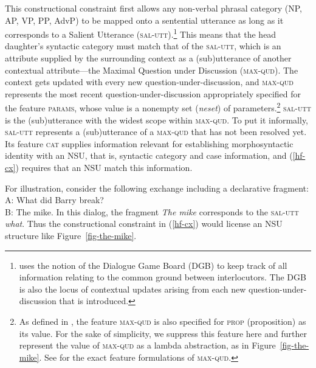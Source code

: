 \zs
%
%
This constructional constraint first allows 
any non-verbal phrasal category (NP, AP, VP, PP, AdvP) to be mapped onto a sentential utterance as long as it corresponds to a Salient Utterance (\textsc{sal-utt}).\footnote{\citet{Ginzburg2012} uses the notion of the Dialogue Game Board (DGB) to keep track of all information relating to the common ground between interlocutors. The DGB is also the locus of contextual updates arising from each new question-under-discussion that is introduced.}
 This means that
the head daughter's syntactic category must match that of the \textsc{sal-utt}, which is an attribute supplied by the surrounding context as a (sub)utterance of another contextual attribute---the Maximal Question under Discussion (\textsc{max-qud}). The context gets updated with every new question-under-discussion, and \textsc{max-qud} represents the most recent question-under-discussion appropriately specified for the feature \textsc{params}, whose value is a nonempty set (\textit{neset}) of parameters.\footnote{As defined in \citet[304]{Ginzburg:Sag:2000}, the feature \textsc{max-qud} is also specified for \textsc{prop} (proposition) as its value. For the sake of simplicity, we suppress this feature here and further 
represent the value of
\textsc{max-qud} as a lambda abstraction, as in Figure~\ref{fig-the-mike}. 
See \citet[304]{Ginzburg:Sag:2000} for the
exact feature formulations of \textsc{max-qud}.} \textsc{sal-utt} is the (sub)utterance with the widest scope within \textsc{max-qud}. To put it informally, \textsc{sal-utt} represents a (sub)utterance of a \textsc{max-qud} that has not been resolved yet. Its feature \textsc{cat} supplies information relevant for establishing morphosyntactic identity with an NSU, that is, syntactic category and case information, and (\ref{hf-cx}) requires that an NSU  match this information. 

For illustration, consider the following exchange including 
a declarative fragment:
%
\ea
A: What did Barry break? \\
B: The mike.\label{37}
\z
%
In this dialog, the fragment \emph{The mike} 
corresponds to the \textsc{sal-utt} \emph{what}. Thus  
  the constructional constraint in (\ref{hf-cx}) would license an NSU structure
  like Figure~\ref{fig-the-mike}.
  
